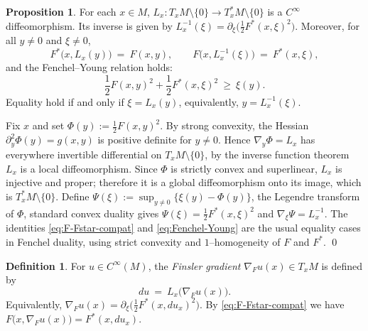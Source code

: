 \documentclass[fleqn,11pt,twoside]{article}
\makeatletter
\renewenvironment{proof}[1][\proofname]{\par
  \normalfont
  \topsep6\p@\@plus6\p@ \trivlist
  \item[\hskip\labelsep\textbf{%
    #1\@addpunct{.}}]\ignorespaces
}{%
  \qed\endtrivlist
}
\theoremstyle{definition}
\newtheorem*{definition}{Definition}
\newtheorem{proposition}{Proposition}
\makeatother
\begin{document}
\begin{proposition}\label{prop:Legendre-diffeo}
For each $x\in M$, $L_x:T_xM\setminus\{0\}\to T_x^*M\setminus\{0\}$ is a $C^\infty$ diffeomorphism.
Its inverse is given by $L_x^{-1}(\xi)=\partial_\xi\!\big(\tfrac 12 F^*(x,\xi)^2\big)$.
Moreover, for all $y\neq 0$ and $\xi\neq 0$,
\begin{equation}\label{eq:F-Fstar-compat}
F^*\!\big(x,L_x(y)\big)\ =\ F(x,y),\qquad
F\!\big(x,L_x^{-1}(\xi)\big)\ =\ F^*(x,\xi),
\end{equation}
and the Fenchel--Young relation holds:
\begin{equation}\label{eq:Fenchel-Young}
\frac 12 F(x,y)^2 + \frac 12 F^*(x,\xi)^2 \ \ge\ \xi(y).
\end{equation}
Equality hold if and only if $\xi=L_x(y)$, equivalently, $y=L_x^{-1}(\xi)$.
\end{proposition}

\begin{proof}
Fix $x$ and set $\Phi(y):=\frac 12 F(x,y)^2$. By strong convexity, the Hessian $\partial_{y}^2\Phi(y)=g(x,y)$ is positive definite for $y\neq 0$. Hence $\nabla_y\Phi=L_x$ has everywhere invertible differential on $T_xM\setminus\{0\}$, by the inverse function theorem $L_x$ is a local diffeomorphism. Since $\Phi$ is strictly convex and superlinear, $L_x$ is injective
and proper; therefore it is a global diffeomorphism onto its image, which is $T_x^*M\setminus\{0\}$.
Define $\Psi(\xi):=\sup_{y\neq 0}\{\xi(y)-\Phi(y)\}$, the Legendre transform of $\Phi$, standard convex
duality gives $\Psi(\xi)=\frac 12 F^*(x,\xi)^2$ and $\nabla_\xi\Psi=L_x^{-1}$. The identities
\eqref{eq:F-Fstar-compat} and \eqref{eq:Fenchel-Young} are the usual equality cases in Fenchel duality, using strict convexity and $1$--homogeneity of $F$ and $F^*$.
\end{proof}

\begin{definition}\label{def:gradF}
For $u\in C^\infty(M)$, the \emph{Finsler gradient} $\nabla_F u(x)\in T_xM$ is defined by
\begin{equation}\label{eq:gradF}
du\ =\ L_x\big(\nabla_F u(x)\big).
\end{equation}
Equivalently, $\nabla_F u(x)=\partial_\xi\big(\frac 12 F^*(x,du_x)^2\big)$. By \eqref{eq:F-Fstar-compat} we have $F\!\big(x,\nabla_F u(x)\big)=F^*(x,du_x)$.
\end{definition}

\end{document}
